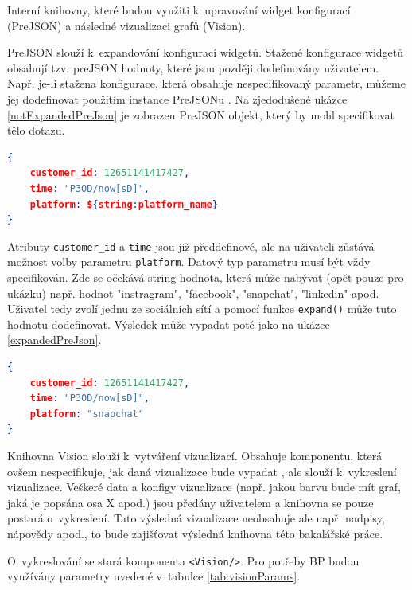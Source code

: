 \documentclass[czech, bc, kiv, he, iso690numb]{fasthesis}
\begin{document}
Interní knihovny, které budou využiti k~upravování widget konfigurací (PreJSON) a následné vizualizaci grafů (Vision).

PreJSON slouží k~expandování konfigurací widgetů. Stažené konfigurace widgetů obsahují tzv. preJSON hodnoty, které jsou později dodefinovány uživatelem. Např. je-li stažena konfigurace, která obsahuje
nespecifikovaný parametr, můžeme jej dodefinovat použitím instance PreJSONu \cite{preJSONDocs}. Na zjedodušené ukázce \ref{notExpandedPreJson} je zobrazen PreJSON objekt, který by mohl specifikovat tělo dotazu. 

\begin{lstlisting}[language=json, caption={Neexpandovaný PreJSON objekt}, label=notExpandedPreJson]
{
	customer_id: 12651141417427,
	time: "P30D/now[sD]",
	platform: ${string:platform_name}
}
\end{lstlisting}
		
Atributy \texttt{customer\_id} a \texttt{time} jsou již předdefinové, ale na uživateli zůstává možnost volby parametru \texttt{platform}. Datový typ parametru musí být vždy specifikován.
Zde se očekává string hodnota, která může nabývat (opět pouze pro ukázku) např. hodnot "instragram", "facebook", "snapchat", "linkedin" apod. Uživatel tedy zvolí jednu ze sociálních sítí
a pomocí funkce \texttt{expand()} může tuto hodnotu dodefinovat. Výsledek může vypadat poté jako na ukázce \ref{expandedPreJson}.

\begin{lstlisting}[language=json, caption={Expandovaný PreJSON objekt}, label=expandedPreJson]
{
	customer_id: 12651141417427,
	time: "P30D/now[sD]",
	platform: "snapchat"
}
\end{lstlisting}

Knihovna Vision slouží k~vytváření vizualizací. Obsahuje komponentu, která ovšem nespecifikuje, jak daná vizualizace bude vypadat \cite{visionDocs}, ale slouží k~vykreslení vizualizace. 
Veškeré data a konfigy vizualizace (např. jakou barvu bude mít graf, jaká je popsána osa X apod.) jsou předány uživatelem a knihovna se pouze postará o~vykreslení. Tato výsledná vizualizace 
neobsahuje ale např. nadpisy, nápovědy apod., to bude zajišťovat výsledná knihovna této bakalářské práce.

O~vykreslování se stará komponenta \texttt{<Vision/>}. Pro potřeby BP budou využívány parametry uvedené v~tabulce \ref{tab:visionParams}.
\end{document}
